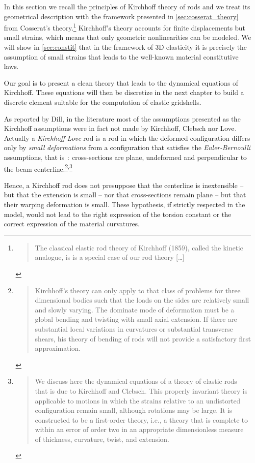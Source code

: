In this section we recall the principles of Kirchhoff theory of rods and we treat its geometrical description with the framework presented in \cref{sec:cosserat_theory} from Cosserat's theory.\footnote{\blockcquote[p.~238]{Antman2005}{The classical elastic rod theory of Kirchhoff (1859), called the kinetic analogue, is is a special case of our rod theory [\dots]}.} Kirchhoff's theory accounts for finite displacements but small strains, which means that only geometric nonlinearities can be modeled. We will show in \cref{sec:constit} that in the framework of 3D elasticity it is precisely the assumption of small strains that leads to the well-known material constitutive laws.

Our goal is to present a clean theory that leads to the dynamical equations of Kirchhoff. These equations will then be discretize in the next chapter to build a discrete element suitable for the computation of elastic gridshells.

As reported by Dill, in the literature most of the assumptions presented as the Kirchhoff assumptions were in fact not made by Kirchhoff, Clebsch nor Love. Actually a \emph{Kirchhoff-Love} rod is a rod in which the deformed configuration differs only by \emph{small deformations} from a configuration that satisfies the \emph{Euler-Bernoulli} assumptions, that is~: cross-sections are plane, undeformed and perpendicular to the beam centerline.\footnote{\blockcquote[p.~18]{Dill1992}{Kirchhoff's theory can only apply to that class of problems for three dimensional bodies such that the loads on the sides are relatively small and slowly varying. The dominate mode of deformation must be a global bending and twisting with small axial extension. If there are substantial local variations in curvatures or substantial transverse shears, his theory of bending of rods will not provide a satisfactory first approximation.}}\textsuperscript{,}\footnote{\blockcquote[p.~1]{Coleman1993}{We discuss here the dynamical equations of a theory of elastic rods that is due to Kirchhoff and Clebsch. This properly invariant theory is applicable to motions in which the strains relative to an undistorted configuration remain small, although rotations may be large. It is constructed to be a first-order theory, i.e., a theory that is complete to within an error of order two in an appropriate dimensionless measure of thickness, curvature, twist, and extension.}}

Hence, a Kirchhoff rod does not presuppose that the centerline is inextensible -- but that the extension is small -- nor that cross-sections remain plane -- but that their warping deformation is small. These hypothesis, if strictly respected in the model, would not lead to the right expression of the torsion constant or the correct expression of the material curvatures.

